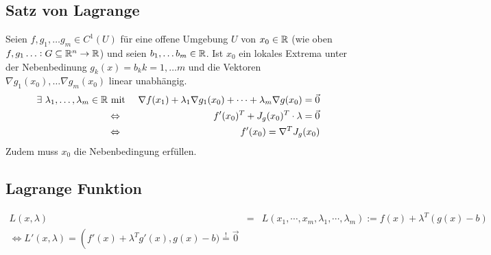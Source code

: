 \subsection{Satz von Lagrange}
Seien $f, g_1, \ldots g_m \in C^1(U)$ für eine offene Umgebung $U$ von $x_0 \in \mathbb{R}$
(wie oben $f,g_1 \ldots : G \subseteq \mathbb{R}^n \rightarrow \mathbb{R}$) und seien
$b_1, \ldots b_m \in \mathbb{R}$. Ist $x_0$ ein lokales Extrema unter der Nebenbedinung
$g_k(x) = b_k k=1,\ldots m$ und die Vektoren $\nabla g_1(x_0), \ldots \nabla g_m(x_0)$
linear unabhängig.
\begin{eqnarray*}
    \exists\  \lambda_1, \ldots, \lambda_m \in \mathbb{R} &\text{ mit }&
    \nabla f(x_1) + \lambda_1 \nabla g_1(x_0) + \cdots + \lambda_m \nabla g(x_0)
    = \vec{0} \\
    &\Leftrightarrow& f'(x_0)^T + J_g(x_0)^T \cdot \lambda = \vec{0} \\
    &\Leftrightarrow& f'(x_0) = \nabla^T J_g(x_0)
\end{eqnarray*}
Zudem muss $x_0$ die Nebenbedingung erfüllen.

\subsection{Lagrange Funktion}
\begin{eqnarray*}
    L(x,\lambda) &=& L(x_1, \cdots, x_m, \lambda_1, \cdots, \lambda_m)
    := f(x) + \lambda^T (g(x) - b) \\
    \Leftrightarrow L'(x,\lambda) = \left( f'(x) + \lambda^T g'(x), g(x)-b)
    \stackrel{!}{=} \vec{0}
\end{eqnarray*}
